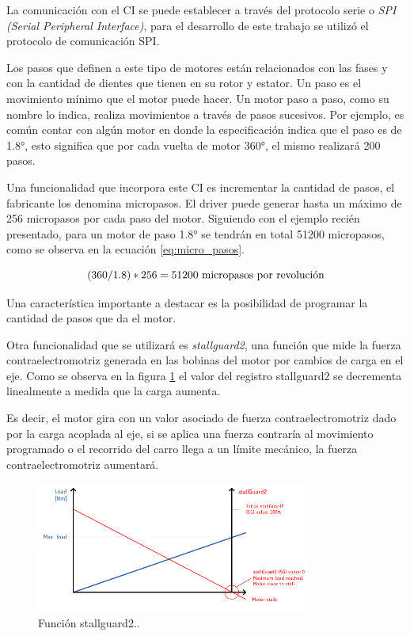 La comunicación con el CI se puede establecer a través del protocolo serie o \textit{SPI (Serial Peripheral Interface)}, para el desarrollo de este trabajo se utilizó el protocolo de comunicación SPI.

Los pasos que definen a este tipo de motores están relacionados con las fases y con la cantidad de dientes que tienen en su rotor y estator. Un paso es el movimiento mínimo que el motor puede hacer. Un motor paso a paso, como su nombre lo indica, realiza movimientos a través de pasos sucesivos. Por ejemplo, es común contar con algún motor en donde la especificación indica que el paso es de \ang{1.8}, esto significa que por cada vuelta de motor \ang{360}, el mismo realizará 200 pasos.

Una funcionalidad que incorpora este CI es incrementar la cantidad de pasos, el fabricante los denomina micropasos. El driver puede generar hasta un máximo de 256 micropasos por cada paso del motor. Siguiendo con el ejemplo recién presentado, para un motor de paso \ang{1.8} se tendrán en total 51200 micropasos, como se observa en la ecuación \ref{eq:micro_pasos}.

\begin{equation}
	\label{eq:micro_pasos}
		(360/1.8) * 256 = 51200 \textup{ micropasos por revolución}
\end{equation}


Una característica importante a destacar es la posibilidad de programar la cantidad de pasos que da el motor.


Otra funcionalidad que se utilizará es \textit{stallguard2}, una función que mide la fuerza contraelectromotriz generada en las bobinas del motor por cambios de carga en el eje. Como se observa en la figura \ref{fig:tmc5130_stallGuard2} el valor del registro stallguard2 se decrementa linealmente a medida que la carga aumenta.

Es decir, el motor gira con un valor asociado de fuerza contraelectromotriz dado por la carga acoplada al eje, si se aplica una fuerza contraría al movimiento programado o el recorrido del carro llega a un límite mecánico, la fuerza contraelectromotriz aumentará. 

\begin{figure}[h]
\centering 
\includegraphics[width=0.8\textwidth]{./Figures/tmc5130_stallguard2.png}
\caption{Función stallguard2.\protect\footnotemark.}
\label{fig:tmc5130_stallGuard2}
\end{figure}


